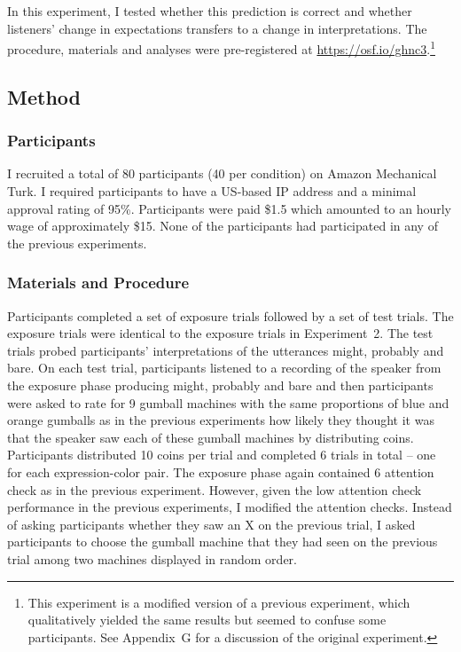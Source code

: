 In this experiment, I tested whether this prediction is correct and whether listeners' change in expectations transfers to a change in interpretations. 
The procedure, materials and analyses were pre-registered at \url{https://osf.io/ghnc3}.\footnote{This experiment is a modified version of a previous experiment, which qualitatively yielded the same results but seemed to confuse some participants. See Appendix~G for a discussion of the original experiment.}

\subsection{Method}

\subsubsection{Participants}

I recruited a total of 80 participants (40 per condition) on Amazon Mechanical Turk. I required participants to have a US-based IP address and a minimal approval rating of 95\%. Participants were paid \$1.5 which amounted to an hourly wage of approximately \$15. None of the participants had participated in any of the previous experiments. 

\subsubsection{Materials and Procedure}

Participants completed a set of exposure trials followed by a set of test trials. The exposure trials were identical to the exposure trials in Experiment~2. The test trials probed participants' interpretations of the utterances {\sc might}, {\sc probably} and {\sc bare}. On each test trial, participants listened to a recording of the speaker from the exposure phase producing {\sc might}, {\sc probably} and {\sc bare} and then participants were asked to rate for 9 gumball machines with the same proportions of blue and orange gumballs as in the previous experiments how likely they thought it was that the speaker saw each of these gumball machines by distributing coins.  Participants distributed 10 coins per trial and completed 6 trials in total  -- one for each expression-color pair. The exposure phase again contained  6 attention check as in the previous experiment. However, given the low attention check performance in the previous experiments, I modified the attention checks. Instead of asking participants whether they saw an X on the previous trial, I asked participants to choose the gumball machine that they had seen on the previous trial among two machines displayed in random order.

